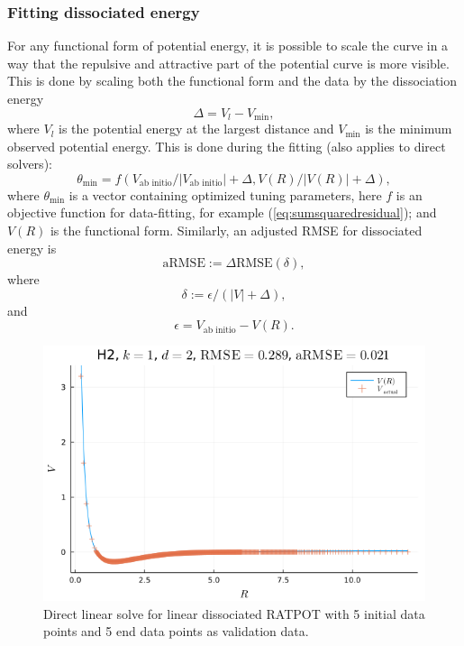 \documentclass[12pt]{article}
\begin{document}
\subsubsection{Fitting dissociated energy}
For any functional form of potential energy, it is possible to scale the curve in a way that the repulsive and attractive part of the potential curve is more visible. This is done by scaling both the functional form and the data by the dissociation energy
\begin{equation}
    \Delta = V_l - V_{\min},
    \label{eq:diss_energy}
\end{equation}
where $V_l$ is the potential energy at the largest distance and $V_{\min}$ is the minimum observed potential energy. This is done during the fitting (also applies to direct solvers):
\begin{equation}
    \theta_{\min} = f(V_\text{ab initio} / |V_\text{ab initio}| + \Delta, V(R) / |V(R)| + \Delta),
    \label{eq:diss_solve}
\end{equation}
where $\theta_{\min}$ is a vector containing optimized tuning parameters, here $f$ is an objective function for data-fitting, for example (\ref{eq:sumsquaredresidual}); and $V(R)$ is the functional form. Similarly, an adjusted RMSE for dissociated energy is
\begin{equation}
    \text{aRMSE} := \Delta \text{RMSE}(\delta),
    \label{eq:aRMSE}
\end{equation}
where
\begin{equation}
    \delta := \epsilon /(|V|+\Delta),
    \label{eq:delta}
\end{equation}
and
\begin{equation}
    \epsilon = V_\text{ab initio} - V(R).
    \label{eq:eps}
\end{equation}
\begin{figure}[htbp]
    \centering
    \includegraphics[scale=0.7]{img/linear_RATPOT/linratpot_linsolve_H2_val-end.png}
    \caption{Direct linear solve for linear dissociated RATPOT with 5 initial data points and 5 end data points as validation data.}
    \label{fig:linratpot_diss_linsolve}
\end{figure}
\end{document}
